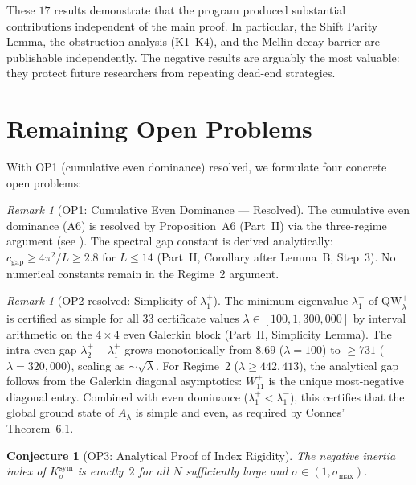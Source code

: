 \documentclass[12pt,a4paper]{article}
\newtheorem{conjecture}[theorem]{Conjecture}
\theoremstyle{definition}
\theoremstyle{remark}
\newtheorem{remark}[theorem]{Remark}
\newcommand{\Ksym}{K_\sigma^{\mathrm{sym}}}
\begin{document}
\noindent These $17$ results demonstrate that the program produced substantial contributions independent of the main proof. In particular, the Shift Parity Lemma, the obstruction analysis (K1--K4), and the Mellin decay barrier are publishable independently. The negative results are arguably the most valuable: they protect future researchers from repeating dead-end strategies.


\section{Remaining Open Problems}
\label{sec:open-problems}

With OP1 (cumulative even dominance) resolved, we formulate four concrete open problems:

\begin{remark}[OP1: Cumulative Even Dominance --- Resolved]
\label{rem:OP1-resolved}
The cumulative even dominance (A6) is resolved by Proposition~A6 (Part~II) via the three-regime argument (see ). The spectral gap constant is derived analytically: $c_{\mathrm{gap}} \geq 4\pi^2/L \geq 2.8$ for $L \leq 14$ (Part~II, Corollary after Lemma~B, Step~3). No numerical constants remain in the Regime~2 argument.
\end{remark}

\begin{remark}[OP2 resolved: Simplicity of $\lambda_1^+$]
\label{rem:OP2-resolved}
The minimum eigenvalue $\lambda_1^+$ of $\mathrm{QW}_\lambda^+$ is certified as simple for all $33$ certificate values $\lambda \in [100, 1{,}300{,}000]$ by interval arithmetic on the $4 \times 4$ even Galerkin block (Part~II, Simplicity Lemma). The intra-even gap $\lambda_2^+ - \lambda_1^+$ grows monotonically from $8.69$ ($\lambda = 100$) to $\geq 731$ ($\lambda = 320{,}000$), scaling as $\sim\!\sqrt{\lambda}$. For Regime~2 ($\lambda \geq 442{,}413$), the analytical gap follows from the Galerkin diagonal asymptotics: $W_{11}^+$ is the unique most-negative diagonal entry. Combined with even dominance ($\lambda_1^+ < \lambda_1^-$), this certifies that the global ground state of $A_\lambda$ is simple and even, as required by Connes' Theorem~6.1.
\end{remark}

\begin{conjecture}[OP3: Analytical Proof of Index Rigidity]
\label{conj:OP3}
The negative inertia index of $\Ksym$ is exactly~$2$ for all $N$ sufficiently large and $\sigma \in (1, \sigma_{\max})$.
\end{conjecture}
\end{document}
